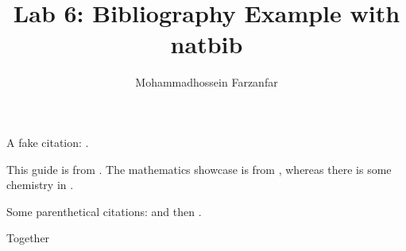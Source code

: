 \documentclass{article}
\author{Mohammadhossein Farzanfar}
\title{Lab 6: Bibliography Example with natbib}
\begin{document}
A fake citation: \citet{FakeKey2024}.
\maketitle
This guide is from \citet{Kulyabov2023}. The mathematics showcase is from \citet{Graham1995}, whereas there is some chemistry in \citet{Thomas2008}.

Some parenthetical citations: \citep{Kulyabov2023} and then \citep[p.~56]{Thomas2008}.

\citep[See][pp.~45--48]{Graham1995}

Together \citep{Kulyabov2023,Graham1995,Thomas2008}



\end{document}
